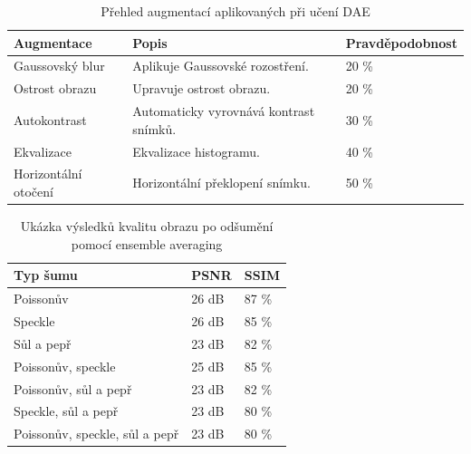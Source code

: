\documentclass[male,czech,api_ing]{thesis}
\begin{document}
\begin{table}[h]
    \centering
    \begin{tabular}{|l|l|l|}
    \hline
    \textbf{Augmentace}  & \textbf{Popis}                          & \textbf{Pravděpodobnost} \\ \hline
    Gaussovský blur      & Aplikuje Gaussovské rozostření.         &  20 \%                   \\ \hline
    Ostrost obrazu       & Upravuje ostrost obrazu.                &  20 \%                   \\ \hline
    Autokontrast         & Automaticky vyrovnává kontrast snímků.  &  30 \%                   \\ \hline
    Ekvalizace           & Ekvalizace histogramu.                  &  40 \%                   \\ \hline
    Horizontální otočení & Horizontální překlopení snímku.         &  50 \%                   \\ \hline
    \end{tabular}
    \caption{Přehled augmentací aplikovaných při učení DAE}
    \label{tab:DAE_augmentation}
\end{table}

\begin{table}[h]
    \centering
    \begin{tabular}{|l|l|l|}
    \hline
    \textbf{Typ šumu}               & \textbf{PSNR} & \textbf{SSIM} \\ \hline
    Poissonův                       & 26 dB         &  87 \%        \\ \hline
    Speckle                         & 26 dB         &  85 \%        \\ \hline
    Sůl a pepř                      & 23 dB         &  82 \%        \\ \hline
    Poissonův, speckle              & 25 dB         &  85 \%        \\ \hline
    Poissonův, sůl a pepř           & 23 dB         &  82 \%        \\ \hline
    Speckle, sůl a pepř             & 23 dB         &  80 \%        \\ \hline
    Poissonův, speckle, sůl a pepř  & 23 dB         &  80 \%        \\ \hline
    \end{tabular}
    \caption{Ukázka výsledků kvalitu obrazu po odšumění pomocí ensemble averaging}
    \label{tab:DAEResults}
\end{table}
\end{document}
